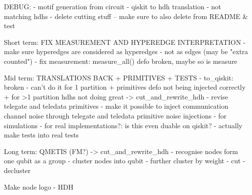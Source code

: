 DEBUG: 
- motif generation from circuit
- qiskit to hdh translation - not matching hdhs
- delete cutting stuff -- make sure to also delete from README & test

Short term: FIX MEASUREMENT AND HYPEREDGE INTERPRETATION
- make sure hyperedges are considered as hyperedges - not as edges (may be "extra counted")
- fix measurement: measure_all() defo broken, maybe so is measure

Mid term: TRANSLATIONS BACK + PRIMITIVES + TESTS 
- to_qiskit: broken - can't do it for 1 partition + primitives defo not being injected correctly + for >1 partition hdhs not doing great
    -> cut_and_rewrite_hdh
- revise telegate and teledata primitives
- make it possible to inject communication channel noise through telegate and teledata primitive noise injections 
    - for simulations
    - for real implementations?: is this even duable on qiskit?
- actually make tests into real tests

Long term: QMETIS (FM?)     -> cut_and_rewrite_hdh
- recognise nodes form one qubit as a group
- cluster nodes into qubit
- further cluster by weight
- cut
- decluster

Make node logo - HDH